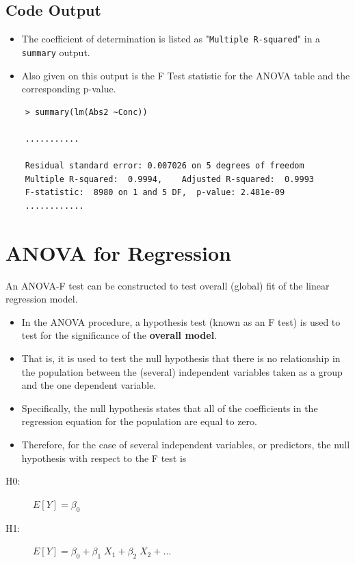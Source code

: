 \documentclass[a4paper,12pt]{article}
\begin{document}
\newpage
\subsection*{Code Output}
\begin{itemize}
	\item The coefficient of determination is listed as "\texttt{Multiple R-squared}" in a \texttt{summary} output. 
	\item Also given on this output is the F Test statistic for the ANOVA table and the corresponding p-value.
\end{itemize}
{
	\large
\begin{framed}
	\begin{verbatim}
	> summary(lm(Abs2 ~Conc))
	
	...........
	
	Residual standard error: 0.007026 on 5 degrees of freedom
	Multiple R-squared:  0.9994,    Adjusted R-squared:  0.9993 
	F-statistic:  8980 on 1 and 5 DF,  p-value: 2.481e-09
	............
	\end{verbatim}
\end{framed}
}



\newpage
\section{ANOVA for Regression}
An ANOVA-F test can be constructed to test overall (global)
fit of the linear regression model.

\begin{itemize}
\item In the ANOVA procedure, a hypothesis test (known as an F test) is used to test for the significance of the \textbf{overall model}. 
\item That is, it is used to test the null hypothesis that there is no relationship in the
population between the (several) independent variables taken as a group and the one dependent variable.
\item Specifically, the null hypothesis states that all of the coefficients in the regression equation for the population are equal to zero. 
\item Therefore, for the case of several independent variables, or predictors,
the null hypothesis with respect to the F test is
\end{itemize}


\begin{description}
	\item[H0:] $E[Y] = \beta_0 $
	\item[H1:] $E[Y] = \beta_0 + \beta_1\;X_1 + \beta_2\;X_2 + \ldots$
\end{description}
\end{document}
